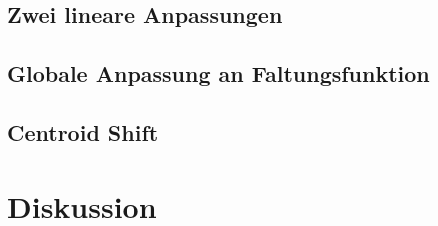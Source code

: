 \documentclass[a4paper,12pt]{article}
\begin{document}
\subsection{Zwei lineare Anpassungen}

\subsection{Globale Anpassung an Faltungsfunktion}

\subsection{Centroid Shift}

\section{Diskussion}


{}
\end{document}
